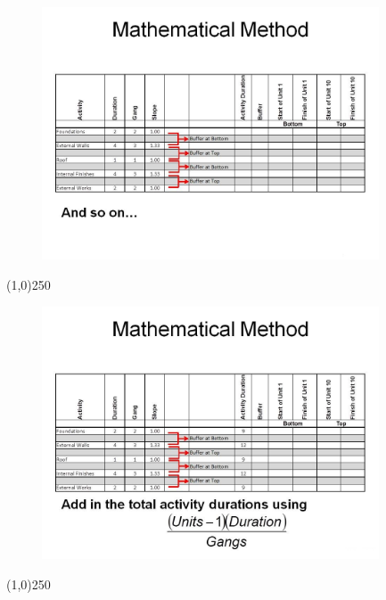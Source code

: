 \begin{frame}
\begin{figure}
	\centering
		\includegraphics[width = 10.0cm]{oldnotes/Slide278.jpg}
\end{figure}
\end{frame}
\begin{center}\line(1,0){250}\end{center}






\begin{frame}
\begin{figure}
	\centering
		\includegraphics[width = 10.0cm]{oldnotes/Slide279.jpg}
\end{figure}
\end{frame}
\begin{center}\line(1,0){250}\end{center}






